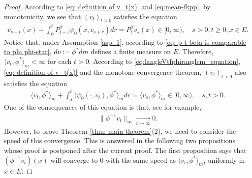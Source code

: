 \documentclass[12pt,a4paper]{amsart}
\theoremstyle{definition}
\numberwithin{equation}{section}
\begin{document}
\begin{proof}
  According to \eqref{eq: definition of v_t(x)} and \eqref{eq:mean-fkpp}, by monotonicity, we see that $(v_t)_{t > 0}$ satisfies the equation
  \begin{align}
    v_{s+t}(x) + \int_0^t P^\beta_{t-r} \psi_0(x,v_{s+r}) dr
    = P^\beta_t v_s(x)
    \in [0,\infty),
    \quad s>0, t \geq 0,x \in E.
  \end{align}
  Notice that, under Assumption \ref{asp: 1}, according to \eqref{eq: p-t-beta is comparable to phi phi-star}, $d\nu:= \phi^* dm$ defines a finite measure on $E$.
  Therefore, $\langle v_t, \phi^*\rangle_m < \infty$ for each $t>0$.
  According to \eqref{eq:langleVtfphiranglem_equation}, \eqref{eq: definition of v_t(x)} and the monotone convergence theorem, $(v_t)_{t> 0}$ also satisfies the equation
  \begin{align} 
    \label{eq: equation of <vt,phi>}
    \langle v_t,\phi^*\rangle_m + \int_s^t \langle \psi_0(\cdot ,v_t) , \phi^*\rangle_m dr
    = \langle v_s,\phi^*\rangle_m
    \in [0,\infty),
    \quad s, t > 0.
  \end{align}
  One of the consequences of this equation is that, see \cite[Lemma 5.1]{RenSongSun2017Spine} for example,
  \begin{align} 
    \label{eq: uniform converges to 0}
    \|\phi^{-1}v_t\|_{\infty} \xrightarrow[t\to \infty]{} 0.
  \end{align}
  However, to prove Theorem \ref{thm: main theorem}(2), we need to consider the speed of this convergence.
  This is answered in the following two propositions whose proof is postponed after the current proof.
  The first proposition says that $(\phi^{-1}v_t)(x)$ will converge to $0$ with the same speed as $\langle v_t,\phi^*\rangle_m$, uniformly in $x\in E$:


\end{proof}
\end{document}
